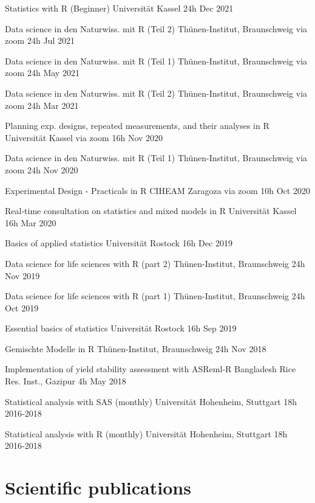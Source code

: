 \documentclass[11pt,a4paper,]{awesome-cv}
\begin{document}
\begin{cvhonors}
\cvhonor
{Statistics with R (Beginner)  }
{Universität Kassel}
{24h}
{Dec 2021  }

\cvhonor
{Data science in den Naturwiss. mit R (Teil 2)  }
{Thünen-Institut, Braunschweig via zoom}
{24h}
{Jul 2021  }

\cvhonor
{Data science in den Naturwiss. mit R (Teil 1)  }
{Thünen-Institut, Braunschweig via zoom}
{24h}
{May 2021  }

\cvhonor
{Data science in den Naturwiss. mit R (Teil 2)  }
{Thünen-Institut, Braunschweig via zoom}
{24h}
{Mar 2021  }

\cvhonor
{Planning exp. designs, repeated measurements, and their analyses in R  }
{Universität Kassel via zoom}
{16h}
{Nov 2020  }

\cvhonor
{Data science in den Naturwiss. mit R (Teil 1)  }
{Thünen-Institut, Braunschweig via zoom}
{24h}
{Nov 2020  }

\cvhonor
{Experimental Design - Practicals in R  }
{CIHEAM Zaragoza via zoom}
{10h}
{Oct 2020  }

\cvhonor
{Real‑time consultation on statistics and mixed models in R  }
{Universität Kassel}
{16h}
{Mar 2020  }

\cvhonor
{Basics of applied statistics  }
{Universität Rostock}
{16h}
{Dec 2019  }

\cvhonor
{Data science for life sciences with R (part 2)  }
{Thünen-Institut, Braunschweig}
{24h}
{Nov 2019  }

\cvhonor
{Data science for life sciences with R (part 1)  }
{Thünen-Institut, Braunschweig}
{24h}
{Oct 2019  }

\cvhonor
{Essential basics of statistics  }
{Universität Rostock}
{16h}
{Sep 2019  }

\cvhonor
{Gemischte Modelle in R  }
{Thünen-Institut, Braunschweig}
{24h}
{Nov 2018  }

\cvhonor
{Implementation of yield stability assessment with ASReml‑R  }
{Bangladesh Rice Res. Inst., Gazipur}
{4h}
{May 2018  }

\cvhonor
{Statistical analysis with SAS (monthly)  }
{Universität Hohenheim, Stuttgart}
{18h}
{2016‑2018  }

\cvhonor
{Statistical analysis with R (monthly)  }
{Universität Hohenheim, Stuttgart}
{18h}
{2016‑2018  }\end{cvhonors}

\hypertarget{scientific-publications}{%
\section{Scientific publications}\label{scientific-publications}}
\end{document}
